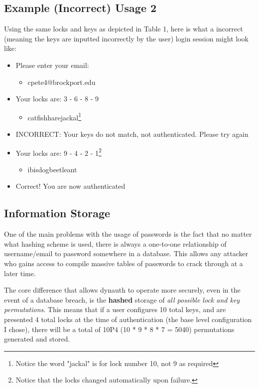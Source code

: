 \documentclass[conference]{IEEEtran}
\begin{document}
\subsection{Example (Incorrect) Usage 2}
	Using the same locks and keys as depicted in Table 1, here is what a incorrect (meaning the keys are inputted incorrectly by the user) login session might look like:
	\begin{itemize}
		\item Please enter your email:
		\begin{itemize}
			\item cpete4@brockport.edu
		\end{itemize}
		\item Your locks are: 3 - 6 - 8 - 9
		\begin{itemize}
			\item catfishharejackal\footnote{Notice the word "jackal" is for lock number 10, not 9 as required}
		\end{itemize}
		\item INCORRECT: Your keys do not match, not authenticated. Please try again
		\item Your locks are: 9 - 4 - 2 - 1\footnote{Notice that the locks changed automatically upon failure.}
		\begin{itemize}
			\item ibisdogbeetleant
		\end{itemize}
		\item Correct! You are now authenticated
	\end{itemize}

\subsection{Information Storage}
	One of the main problems with the usage of passwords is the fact that no matter what hashing scheme is used, there is always a one-to-one relationship of username/email to password somewhere in a database. This allows any attacker who gains access to compile massive tables of passwords to crack through at a later time.
	
	The core difference that allows dynauth to operate more securely, even in the event of a database breach, is the \textbf{hashed} storage of \textit{all possible lock and key permutations}. This means that if a user configures 10 total keys, and are presented 4 total locks at the time of authentication (the base level configuration I chose), there will be a total of 10P4 (10 * 9 * 8 * 7 = 5040) permutations generated and stored.
	
\end{document}
